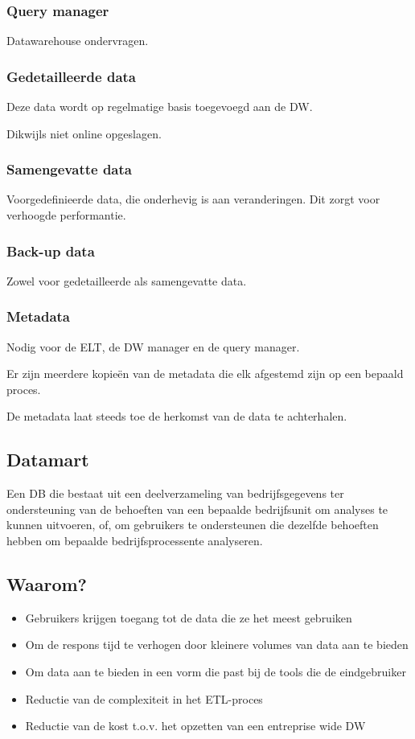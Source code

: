 \documentclass[a4paper,12pt]{article}
\begin{document}
\subsubsection{Query manager}
Datawarehouse ondervragen.

\subsubsection{Gedetailleerde data}
Deze data wordt op regelmatige basis toegevoegd aan de DW.

Dikwijls niet online opgeslagen.

\subsubsection{Samengevatte data}
Voorgedefinieerde data, die onderhevig is aan veranderingen.
Dit zorgt voor verhoogde performantie.

\subsubsection{Back-up data}
Zowel voor gedetailleerde als samengevatte data.

\subsubsection{Metadata}
Nodig voor de ELT, de DW manager en de query manager.

Er zijn meerdere kopieën van de metadata die elk afgestemd zijn op een bepaald proces.

De metadata laat steeds toe de herkomst van de data te achterhalen.

\subsection{Datamart}
Een DB die bestaat uit een deelverzameling van bedrijfsgegevens ter ondersteuning van de behoeften van een bepaalde bedrijfsunit om analyses te kunnen uitvoeren, of, om gebruikers te ondersteunen die dezelfde behoeften hebben om bepaalde bedrijfsprocessente analyseren.

\subsection{Waarom?}
\begin{itemize}
\item Gebruikers krijgen toegang tot de data die ze het meest gebruiken
\item Om de respons tijd te verhogen door kleinere volumes van data aan te bieden
\item Om data aan te bieden in een vorm die past bij de tools die de eindgebruiker
\item Reductie van de complexiteit in het ETL-proces
\item Reductie van de kost t.o.v. het opzetten van een entreprise wide DW
\end{itemize}
\end{document}
